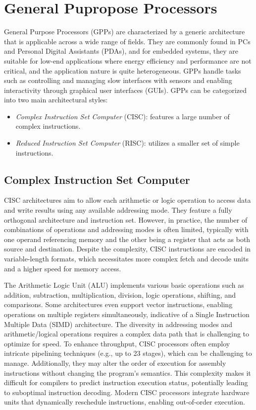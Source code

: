 \section{General Pupropose Processors}

General Purpose Processors (GPPs) are characterized by a generic architecture that is applicable across a wide range of fields. 
They are commonly found in PCs and Personal Digital Assistants (PDAs), and for embedded systems, they are suitable for low-end applications where energy efficiency and performance are not critical, and the application nature is quite heterogeneous.
GPPs handle tasks such as controlling and managing slow interfaces with sensors and enabling interactivity through graphical user interfaces (GUIs).
GPPs can be categorized into two main architectural styles:
\begin{itemize} 
    \item \textit{Complex Instruction Set Computer} (CISC): features a large number of complex instructions. 
    \item \textit{Reduced Instruction Set Computer} (RISC): utilizes a smaller set of simple instructions. 
\end{itemize}

\subsection{Complex Instruction Set Computer} 
CISC architectures aim to allow each arithmetic or logic operation to access data and write results using any available addressing mode. 
They feature a fully orthogonal architecture and instruction set. 
However, in practice, the number of combinations of operations and addressing modes is often limited, typically with one operand referencing memory and the other being a register that acts as both source and destination.
Despite the complexity, CISC instructions are encoded in variable-length formats, which necessitates more complex fetch and decode units and a higher speed for memory access.

The Arithmetic Logic Unit (ALU) implements various basic operations such as addition, subtraction, multiplication, division, logic operations, shifting, and comparisons. 
Some architectures even support vector instructions, enabling operations on multiple registers simultaneously, indicative of a Single Instruction Multiple Data (SIMD) architecture. 
The diversity in addressing modes and arithmetic/logical operations requires a complex data path that is challenging to optimize for speed.
To enhance throughput, CISC processors often employ intricate pipelining techniques (e.g., up to 23 stages), which can be challenging to manage. 
Additionally, they may alter the order of execution for assembly instructions without changing the program's semantics. 
This complexity makes it difficult for compilers to predict instruction execution status, potentially leading to suboptimal instruction decoding. 
Modern CISC processors integrate hardware units that dynamically reschedule instructions, enabling out-of-order execution.

